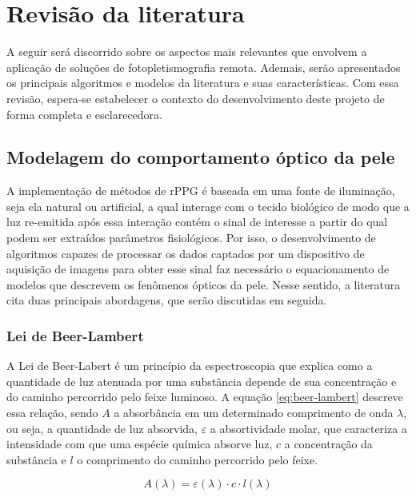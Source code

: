 \chapter{Revisão da literatura}

A seguir será discorrido sobre os aspectos mais relevantes que envolvem a aplicação de soluções de fotopletismografia remota. Ademais, serão apresentados os principais algoritmos e modelos da literatura e suas características. Com essa revisão, espera-se estabelecer o contexto do desenvolvimento deste projeto de forma completa e esclarecedora. 

\section{Modelagem do comportamento óptico da pele}

A implementação de métodos de rPPG é baseada em uma fonte de iluminação, seja ela natural ou artificial, a qual interage com o tecido biológico de modo que a luz re-emitida após essa interação contém o sinal de interesse a partir do qual podem ser extraídos parâmetros fisiológicos. Por isso, o desenvolvimento de algoritmos capazes de processar os dados captados por um dispositivo de aquisição de imagens para obter esse sinal faz necessário o equacionamento de modelos que descrevem os fenômenos ópticos da pele. Nesse sentido, a literatura cita duas principais abordagens, que serão discutidas em seguida. 

\subsection{Lei de Beer-Lambert}
\label{sec:beer-lambert}

A Lei de Beer-Labert é um princípio da espectroscopia que explica como a quantidade de luz atenuada por uma substância depende de sua concentração e do caminho percorrido pelo feixe luminoso. A equação \ref{eq:beer-lambert} descreve essa relação, sendo \(A\) a absorbância em um determinado comprimento de onda \(\lambda\), ou seja, a quantidade de luz absorvida, \(\varepsilon\) a absortividade molar, que caracteriza a intensidade com que uma espécie química absorve luz, \(c\) a concentração da substância e \(l\) o comprimento do caminho percorrido pelo feixe. 

\begin{equation}
\label{eq:beer-lambert}
    A(\lambda) = \varepsilon(\lambda) \cdot c \cdot l(\lambda)
\end{equation}

